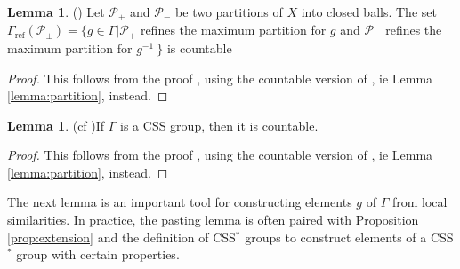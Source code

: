 \documentclass[12pt]{amsart}
\numberwithin{equation}{subsection}
\theoremstyle{definition}
\newtheorem{lemma}[theorem]{Lemma}
\theoremstyle{definition}
\theoremstyle{remark}
\begin{document}
 \begin{lemma}(\cite[Lemma 3.11]{hughes2009}) Let $\mathscr{P}_+$ and $\mathscr{P}_-$ be two partitions of $X$ into closed balls. The set $\Gamma_{\text{ref}}(\mathscr{P}_\pm) = \{g \in \Gamma \vert \mathscr{P}_+$ refines the maximum partition for $g$ and $ \mathscr{P}_-$ refines the maximum partition for $g^{-1} \:\}$ is countable
     
 \end{lemma}

 \begin{proof}
      This follows from the proof \cite[Lemma 3.11]{hughes2009}, using the countable version of \cite[Lemma 3.10]{hughes2009}, ie Lemma \ref{lemma:partition}, instead. 
 \end{proof}

 \begin{lemma}(cf \cite[ Lemma 3.12]{hughes2009})\label{lemma:countable}
     If $\Gamma$ is a CSS group, then it is countable. 
 \end{lemma}

 \begin{proof}
     This follows from the proof \cite[Lemma 3.12]{hughes2009}, using the countable version of \cite[Lemma 3.10]{hughes2009}, ie Lemma \ref{lemma:partition}, instead. 
 \end{proof}



The next lemma is an important tool for constructing elements $g$ of $\Gamma$ from local similarities. In practice, the pasting lemma is often paired with Proposition \ref{prop:extension} and the definition of CSS$^*$ groups to construct elements of a CSS$^*$ group with certain properties. 
\end{document}
